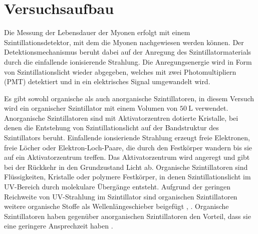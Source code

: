 \section{Versuchsaufbau}
Die Messung der Lebensdauer der Myonen erfolgt mit einem Szintillationsdetektor, mit dem die Myonen 
nachgewiesen werden können.
Der Detektionsmechanismus beruht dabei auf der Anregung des Szintillatormaterials durch die einfallende ionisierende Strahlung.
Die Anregungsenergie wird in Form von Szintillationslicht wieder abgegeben, welches 
mit zwei Photomultipliern (PMT) detektiert und in ein elektrisches Signal umgewandelt wird.

Es gibt sowohl organische als auch anorganische Szintillatoren, in diesem Versuch wird ein 
organischer Szintillator mit einem Volumen von $\SI{50}{\liter}$ verwendet. Anorganische Szintillatoren sind mit 
Aktivatorzentren dotierte Kristalle, bei denen die Entstehung von Szintillationslicht auf der Bandstruktur des Szintillators 
beruht. Einfallende ionsieriende Strahlung erzeugt freie Elektronen, 
freie Löcher oder Elektron-Loch-Paare, die durch den Festkörper wandern bis sie auf ein 
Aktivatorzentrum treffen. Das Aktivatorzentrum wird angeregt und gibt bei der Rückkehr in den Grundzustand
Licht ab. 
Organische Szintillatoren sind Flüssigkeiten, Kristalle oder polymere Festkörper, in denen Szintillationslicht im UV-Bereich
durch molekulare Übergänge entsteht. Aufgrund der geringen Reichweite von 
UV-Strahlung im Szintillator sind organischen Szintillatoren weitere organische Stoffe als Wellenlängeschieber
beigefügt \cite{szintillatoren1}, \cite{szintillatoren2}. 
Organische Szintillatoren
haben gegenüber anorganischen Szintillatoren den Vorteil, dass sie eine geringere Ansprechzeit haben \cite{szintillatoren3}.

